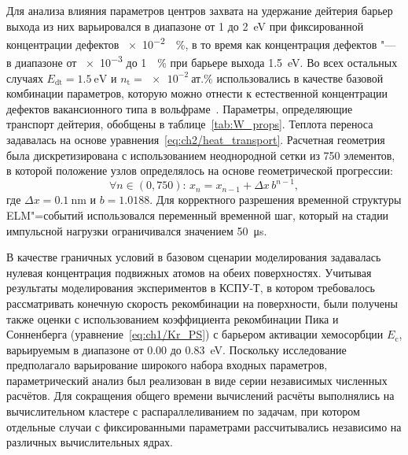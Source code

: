 Для анализа влияния параметров центров захвата на удержание дейтерия барьер выхода из них варьировался в диапазоне от \num{1} до \SI{2}{\electronvolt} при фиксированной концентрации дефектов \SI{e-2}{\percent}, в то время как концентрация дефектов "--- в диапазоне от \num{e-3} до \SI{1}{\percent} при барьере выхода \SI{1.5}{\electronvolt}. Во всех остальных случаях $E_{\mathrm{dt}}=\SI{1.5}{\electronvolt}$ и $n_{\mathrm{t}}=\SI{e-2}{\text{ат.}\percent}$ использовались в качестве базовой комбинации параметров, которую можно отнести к естественной концентрации дефектов вакансионного типа в вольфраме~\cite{DeTemmerman2018}. Параметры, определяющие транспорт дейтерия, обобщены в таблице~\cref{tab:W_props}. Теплота переноса задавалась на основе уравнения~\cref{eq:ch2/heat_transport}. Расчетная геометрия была дискретизирована с использованием неоднородной сетки из 750 элементов, в которой положение узлов определялось на основе геометрической прогрессии:
\[
	\forall n\in(0,750):\,x_{n}=x_{n-1}+\Delta x\,b^{n-1},
\]
где $\Delta x=\SI{0.1}{\nano\meter}$ и $b=\num{1.0188}$. Для корректного разрешения временной структуры ELM"=событий использовался переменный временной шаг, который на стадии импульсной нагрузки ограничивался значением \SI{50}{\micro\second}.

В качестве граничных условий в базовом сценарии моделирования задавалась нулевая концентрация подвижных атомов на обеих поверхностях. Учитывая результаты моделирования экспериментов в КСПУ-Т, в котором требовалось рассматривать конечную скорость рекомбинации на поверхности, были получены также оценки с использованием коэффициента рекомбинации Пика и Сонненберга (уравнение~\cref{eq:ch1/Kr_PS}) с барьером активации хемосорбции \( E_\mathrm{c} \), варьируемым в диапазоне от \num{0.00} до \SI{0.83}{\electronvolt}. Поскольку исследование предполагало варьирование широкого набора входных параметров, параметрический анализ был реализован в виде серии независимых численных расчётов. Для сокращения общего времени вычислений расчёты выполнялись на вычислительном кластере с распараллеливанием по задачам, при котором отдельные случаи с фиксированными параметрами рассчитывались независимо на различных вычислительных ядрах.

